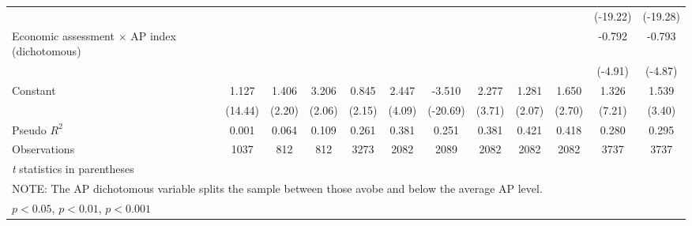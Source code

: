 {\begin{tabular}{l*{11}{c}}
                &                  &                  &                  &                  &                  &                  &                  &                  &                  & (-19.22)         & (-19.28)         \\
Economic assessment $\times$ AP index (dichotomous)&                  &                  &                  &                  &                  &                  &                  &                  &                  &   -0.792\sym{***}&   -0.793\sym{***}\\
                &                  &                  &                  &                  &                  &                  &                  &                  &                  &  (-4.91)         &  (-4.87)         \\
Constant        &    1.127\sym{***}&    1.406\sym{*}  &    3.206\sym{*}  &    0.845\sym{*}  &    2.447\sym{***}&   -3.510\sym{***}&    2.277\sym{***}&    1.281\sym{*}  &    1.650\sym{**} &    1.326\sym{***}&    1.539\sym{***}\\
                &  (14.44)         &   (2.20)         &   (2.06)         &   (2.15)         &   (4.09)         & (-20.69)         &   (3.71)         &   (2.07)         &   (2.70)         &   (7.21)         &   (3.40)         \\
\midrule
Pseudo \(R^{2}\)&    0.001         &    0.064         &    0.109         &    0.261         &    0.381         &    0.251         &    0.381         &    0.421         &    0.418         &    0.280         &    0.295         \\
Observations    &     1037         &      812         &      812         &     3273         &     2082         &     2089         &     2082         &     2082         &     2082         &     3737         &     3737         \\
\bottomrule
\multicolumn{12}{l}{\footnotesize \textit{t} statistics in parentheses}\\
\multicolumn{12}{l}{\footnotesize NOTE: The AP dichotomous variable splits the sample between those avobe and below the average AP level.}\\
\multicolumn{12}{l}{\footnotesize \sym{*} \(p<0.05\), \sym{**} \(p<0.01\), \sym{***} \(p<0.001\)}\\
\end{tabular}
}
